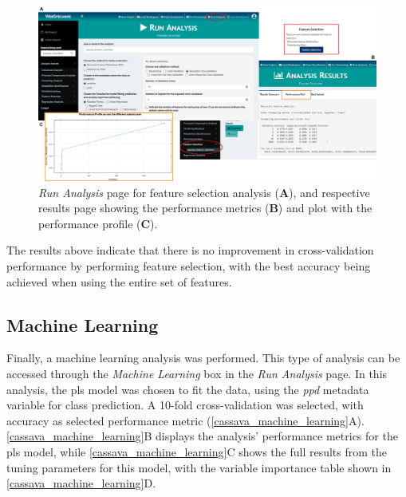 \begin{figure}[H]
	\centering
	\includegraphics[width=1\linewidth]{Imagens/CassavaPPD/feature_selection}
	\caption{\textit{Run Analysis} page for feature selection analysis (\textbf{A}), and respective results page showing the performance metrics (\textbf{B}) and plot with the performance profile (\textbf{C}).}
	\label{cassava_feature_selection}
\end{figure}

The results above indicate that there is no improvement in cross-validation performance by performing feature selection, with the best accuracy being achieved when using the entire set of features.


\subsection{Machine Learning}

Finally, a machine learning analysis was performed. This type of analysis can be accessed through the \textit{Machine Learning} box in the \textit{Run Analysis} page. In this analysis, the \gls{pls} model was chosen to fit the data, using the \textit{ppd} metadata variable for class prediction. A 10-fold cross-validation was selected, with accuracy as selected performance metric (\autoref{cassava_machine_learning}A). \autoref{cassava_machine_learning}B displays the analysis' performance metrics for the \gls{pls} model, while \autoref{cassava_machine_learning}C shows the full results from the tuning parameters for this model, with the variable importance table shown in \autoref{cassava_machine_learning}D.


